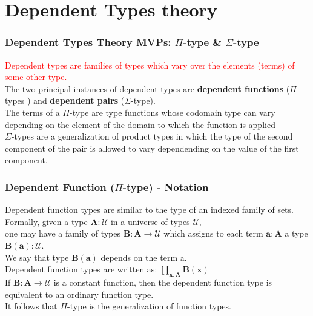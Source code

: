 
\section{Dependent Types theory}


\begin{frame}
\frametitle{Dependent Types Theory MVPs: $\Pi$-type \& $\Sigma$-type}
\textcolor{red}{Dependent types are families of types which vary over the elements (terms) of some other type.}
\\ \medskip
The two principal instances of dependent types are \textbf{dependent functions} ($\Pi$-types ) and \textbf{dependent pairs} ($\Sigma$-type).
\\ \medskip
The terms of a $\Pi$-type are type functions whose codomain type can vary depending on the element of the domain to which the function is applied
\\ \medskip
$\Sigma$-types are a generalization of product types in which the type of the second component of the pair is allowed to vary dependending on the value of the first component.
\end{frame}


\begin{frame}
\frametitle{Dependent Function ($\Pi$-type) - Notation}
Dependent function types are similar to the type of an indexed family of sets.\\ \medskip
Formally, given a type $\pmb{A:\mathcal{U}}$ in a universe of types $\pmb{\mathcal{U}}$, \\ 	
one may have a family of types $\pmb{B : A \rightarrow \mathcal{U}}$ which assigns to each term $\pmb{a: A}$ a type $\pmb{B(a): \mathcal{U}}$.\\ \medskip
We say that type $\pmb{B(a)}$ depends on the term a.\\ \medskip
Dependent function types are written as: $\pmb{\prod_{x:A} B(x)}$ \\ \medskip
If $\pmb{B : A \rightarrow \mathcal{U}}$ is a constant function, then the dependent function type is equivalent to an ordinary function type.\\ \medskip
It follows that $\Pi$-type is the generalization of function types.
\end{frame}


